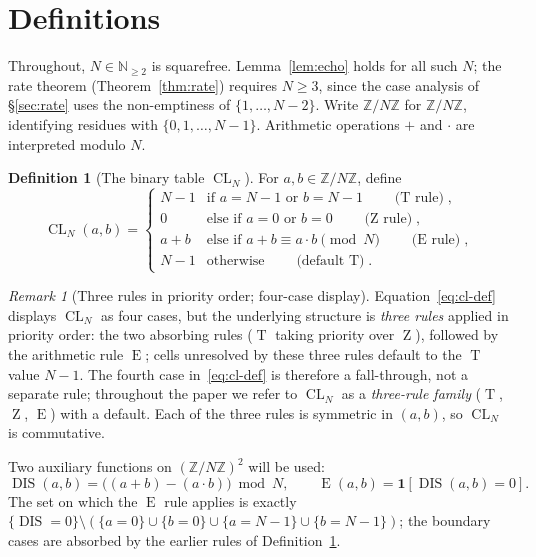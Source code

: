 \documentclass[11pt,reqno]{amsart}
\theoremstyle{plain}
\theoremstyle{definition}
\newtheorem{definition}[theorem]{Definition}
\theoremstyle{remark}
\newtheorem*{remark}{Remark}
\DeclareMathOperator{\DIS}{DIS}
\DeclareMathOperator{\CL}{CL}
\DeclareMathOperator{\ECHO}{E}
\DeclareMathOperator{\HARM}{T}
\DeclareMathOperator{\VOID}{Z}
\newcommand{\ZN}{\mathbb{Z}/N\mathbb{Z}}
\newcommand{\Z}{\mathbb{Z}}
\newcommand{\N}{\mathbb{N}}
\begin{document}
\section{Definitions}\label{sec:def}

Throughout, $N\in\N_{\ge 2}$ is squarefree. Lemma~\ref{lem:echo}
holds for all such $N$; the rate theorem (Theorem~\ref{thm:rate})
requires $N\ge 3$, since the case analysis of \S\ref{sec:rate} uses
the non-emptiness of $\{1,\dots,N-2\}$. Write $\ZN$ for
$\Z/N\Z$, identifying residues with $\{0,1,\dots,N-1\}$. Arithmetic
operations $+$ and $\cdot$ are interpreted modulo $N$.

\begin{definition}[The binary table $\CL_N$]\label{def:cl}
For $a,b\in\ZN$, define
\begin{equation}\label{eq:cl-def}
  \CL_N(a,b)=
  \begin{cases}
     N-1 & \text{if } a=N-1 \text{ or } b=N-1
           \qquad\text{($\HARM$ rule)},\\[1pt]
     0   & \text{else if } a=0 \text{ or } b=0
           \qquad\text{($\VOID$ rule)},\\[1pt]
     a+b & \text{else if } a+b\equiv a\cdot b\pmod N
           \qquad\text{($\ECHO$ rule)},\\[1pt]
     N-1 & \text{otherwise}
           \qquad\text{(default $\HARM$)}.
  \end{cases}
\end{equation}
\end{definition}

\begin{remark}[Three rules in priority order; four-case display]\label{rem:three-rules}
Equation~\eqref{eq:cl-def} displays $\CL_N$ as four cases, but the underlying
structure is \emph{three rules} applied in priority order: the two absorbing
rules ($\HARM$ taking priority over $\VOID$), followed by the arithmetic
rule $\ECHO$; cells unresolved by these three rules default to the $\HARM$
value $N-1$. The fourth case in~\eqref{eq:cl-def} is therefore a
fall-through, not a separate rule; throughout the paper we refer to
$\CL_N$ as a \emph{three-rule family} ($\HARM$, $\VOID$, $\ECHO$) with a
default. Each of the three rules is symmetric in $(a,b)$, so $\CL_N$ is
commutative.
\end{remark}

Two auxiliary functions on $(\ZN)^{2}$ will be used:
\begin{equation}\label{eq:dis-def}
  \DIS(a,b)=\bigl((a+b)-(a\cdot b)\bigr)\bmod N,
  \qquad
  \ECHO(a,b)=\mathbf{1}\!\left[\DIS(a,b)=0\right].
\end{equation}
The set on which the $\ECHO$ rule applies is exactly
$\{\DIS=0\}\setminus(\{a=0\}\cup\{b=0\}\cup\{a=N-1\}\cup\{b=N-1\})$;
the boundary cases are absorbed by the earlier rules of
Definition~\ref{def:cl}.
\end{document}
